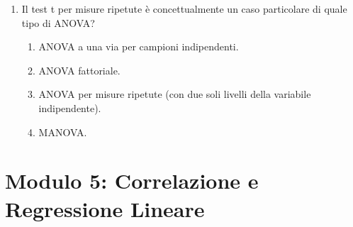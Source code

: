 \documentclass[12pt, a4paper]{article}
\begin{document}
\begin{enumerate}[resume]
    \item Il test t per misure ripetute è concettualmente un caso particolare di quale tipo di ANOVA?
    \begin{enumerate}
        \item ANOVA a una via per campioni indipendenti.
        \item ANOVA fattoriale.
        \item ANOVA per misure ripetute (con due soli livelli della variabile indipendente).
        \item MANOVA.
    \end{enumerate}
    \vspace{0.3cm}
\end{enumerate}

\section*{Modulo 5: Correlazione e Regressione Lineare}
\end{document}
